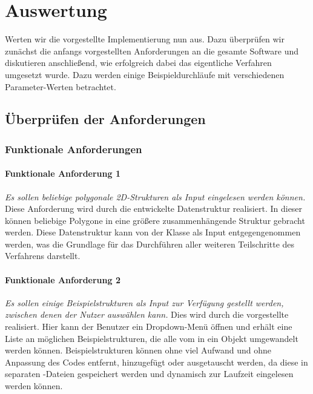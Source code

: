 %
\chapter{Auswertung}
\label{chap:auswertung}
Werten wir die vorgestellte Implementierung nun aus. Dazu überprüfen wir zunächst die anfangs vorgestellten Anforderungen an die gesamte
Software und diskutieren anschließend, wie erfolgreich dabei das eigentliche Verfahren umgesetzt wurde. Dazu werden einige
Beispieldurchläufe mit verschiedenen Parameter-Werten betrachtet.

\section{Überprüfen der Anforderungen}
\subsection{Funktionale Anforderungen}
\subsubsection{Funktionale Anforderung 1}
\textit{Es sollen beliebige polygonale 2D-Strukturen als Input eingelesen werden können.} Diese Anforderung wird
durch die entwickelte  Datenstruktur realisiert. In dieser können beliebige Polygone in eine größere zusammenhängende
Struktur gebracht werden. Diese Datenstruktur kann von der  Klasse als Input entgegengenommen werden, was die
Grundlage für das Durchführen aller weiteren Teilschritte des Verfahrens darstellt.

\subsubsection{Funktionale Anforderung 2}
\textit{Es sollen einige Beispielstrukturen als Input zur Verfügung gestellt werden, zwischen denen der Nutzer auswählen kann.}
Dies wird durch die vorgestellte  realisiert. Hier kann der Benutzer ein Dropdown-Menü öffnen und erhält eine Liste an
möglichen Beispielstrukturen, die alle vom  in ein  Objekt umgewandelt werden können.
Beispielstrukturen können ohne viel Aufwand und ohne Anpassung des Codes entfernt, hinzugefügt oder ausgetauscht werden, da diese in
separaten -Dateien gespeichert werden und dynamisch zur Laufzeit eingelesen werden können.

